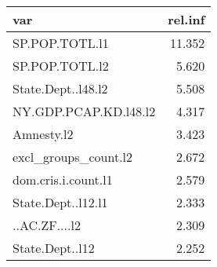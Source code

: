 \begin{tabular}{lr}
  \hline
var & rel.inf \\ 
  \hline
SP.POP.TOTL.l1 & 11.352 \\ 
  SP.POP.TOTL.l2 & 5.620 \\ 
  State.Dept..l48.l2 & 5.508 \\ 
  NY.GDP.PCAP.KD.l48.l2 & 4.317 \\ 
  Amnesty.l2 & 3.423 \\ 
  excl\_groups\_count.l2 & 2.672 \\ 
  dom.cris.i.count.l1 & 2.579 \\ 
  State.Dept..l12.l1 & 2.333 \\ 
  ..AC.ZF....l2 & 2.309 \\ 
  State.Dept..l12 & 2.252 \\ 
   \hline
\end{tabular}
